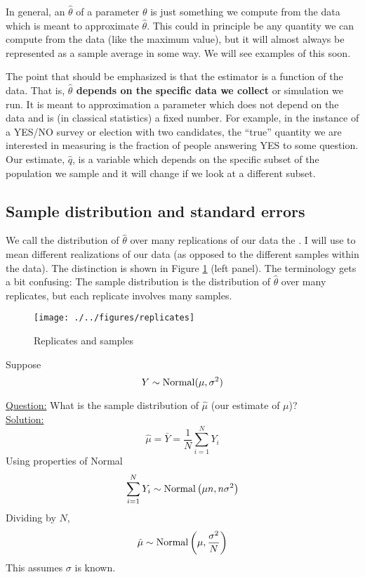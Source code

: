 In general, an  $\hat{\theta}$  of a parameter $\theta$ is just something we compute from the data which is meant to approximate $\hat{\theta}$. This could in principle be any quantity we can compute from the data (like the maximum value), but it will almost always be represented as a sample average in some way. We will see examples of this soon. 

The point that should be emphasized is that the estimator is a function of the data. That is, {\bf $\hat{\theta}$ depends on the specific data we collect} or simulation we run. It is meant to approximation a parameter which does not depend on the data and is (in classical statistics) a fixed number. For example,  in the instance of a YES/NO survey or election with two candidates, the ``true'' quantity we are interested in measuring is the fraction of people answering YES to some question. Our estimate, $\hat{q}$, is a variable which depends on the specific subset of the population we sample and it will change if we look at a different subset. 



\subsection{Sample distribution and standard errors}
 We call the distribution of $\hat{\theta}$ over many replications of our data the . I will use  to mean different realizations of our data (as opposed to the different samples within the data). The distinction is shown in Figure \ref{fig:rep_samp} (left panel). The terminology gets a bit confusing: The sample distribution is the distribution of $\hat{\theta}$ over many replicates, but each replicate involves many samples. 

\begin{figure}[h]
\centering
\texttt{[image: ./../figures/replicates]}
\caption{Replicates and samples }\label{fig:rep_samp}
\end{figure}


\begin{example}
Suppose 
\begin{equation*}
Y \sim {\rm Normal}(\mu,\sigma^2)
\end{equation*}


\noindent
\underline{Question:} What is the sample distribution of $\hat{\mu}$ (our estimate of $\mu$)?\\

\noindent
\underline{Solution:}
\begin{equation*}
\hat{\mu} = \bar{Y} = \frac{1}{N}\sum_{i=1}^NY_i
\end{equation*}
Using properties of Normal 
\begin{equation*}
\sum_{i=1}^NY_i \sim {\rm Normal}\left(\mu n,n\sigma^2 \right)
\end{equation*}
 Dividing by $N$, 
\begin{equation*}
\hat{\mu} \sim {\rm Normal}\left(\mu ,\frac{\sigma^2}{N} \right)
\end{equation*}
This assumes $\sigma$ is known.

\end{example} 

